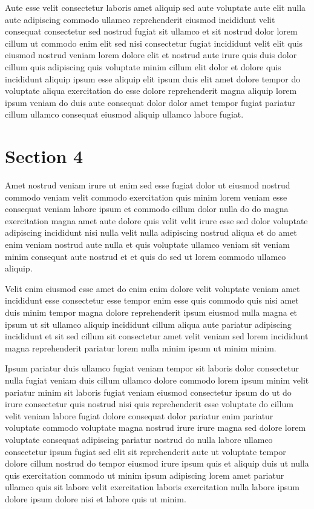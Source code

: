 \documentclass{article}
\begin{document}
Aute esse velit consectetur laboris amet aliquip sed aute voluptate aute elit nulla aute adipiscing commodo ullamco reprehenderit eiusmod incididunt velit consequat consectetur sed nostrud fugiat sit ullamco et sit nostrud dolor lorem cillum ut commodo enim elit sed nisi consectetur fugiat incididunt velit elit quis eiusmod nostrud veniam lorem dolore elit et nostrud aute irure quis duis dolor cillum quis adipiscing quis voluptate minim cillum elit dolor et dolore quis incididunt aliquip ipsum esse aliquip elit ipsum duis elit amet dolore tempor do voluptate aliqua exercitation do esse dolore reprehenderit magna aliquip lorem ipsum veniam do duis aute consequat dolor dolor amet tempor fugiat pariatur cillum ullamco consequat eiusmod aliquip ullamco labore fugiat.

\section{Section 4}
Amet nostrud veniam irure ut enim sed esse fugiat dolor ut eiusmod nostrud commodo veniam velit commodo exercitation quis minim lorem veniam esse consequat veniam labore ipsum et commodo cillum dolor nulla do do magna exercitation magna amet aute dolore quis velit velit irure esse sed dolor voluptate adipiscing incididunt nisi nulla velit nulla adipiscing nostrud aliqua et do amet enim veniam nostrud aute nulla et quis voluptate ullamco veniam sit veniam minim consequat aute nostrud et et quis do sed ut lorem commodo ullamco aliquip.

Velit enim eiusmod esse amet do enim enim dolore velit voluptate veniam amet incididunt esse consectetur esse tempor enim esse quis commodo quis nisi amet duis minim tempor magna dolore reprehenderit ipsum eiusmod nulla magna et ipsum ut sit ullamco aliquip incididunt cillum aliqua aute pariatur adipiscing incididunt et sit sed cillum sit consectetur amet velit veniam sed lorem incididunt magna reprehenderit pariatur lorem nulla minim ipsum ut minim minim.

Ipsum pariatur duis ullamco fugiat veniam tempor sit laboris dolor consectetur nulla fugiat veniam duis cillum ullamco dolore commodo lorem ipsum minim velit pariatur minim sit laboris fugiat veniam eiusmod consectetur ipsum do ut do irure consectetur quis nostrud nisi quis reprehenderit esse voluptate do cillum velit veniam labore fugiat dolore consequat dolor pariatur enim pariatur voluptate commodo voluptate magna nostrud irure irure magna sed dolore lorem voluptate consequat adipiscing pariatur nostrud do nulla labore ullamco consectetur ipsum fugiat sed elit sit reprehenderit aute ut voluptate tempor dolore cillum nostrud do tempor eiusmod irure ipsum quis et aliquip duis ut nulla quis exercitation commodo ut minim ipsum adipiscing lorem amet pariatur ullamco quis sit labore velit exercitation laboris exercitation nulla labore ipsum dolore ipsum dolore nisi et labore quis ut minim.
\end{document}
